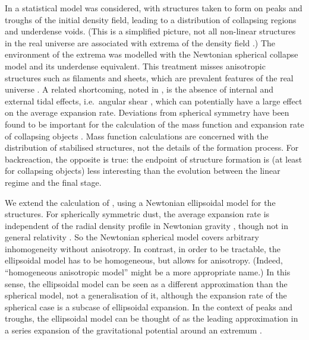 \documentclass[11pt, a4paper]{article}
\newcommand{\ie}{i.e.\ }
\begin{document}
In \cite{Rasanen:2008it} a statistical model was considered, with structures taken to form on peaks and troughs of the initial density field, leading to a distribution of collapsing regions and underdense voids. (This is a simplified picture, not all non-linear structures in the real universe are associated with extrema of the density field \cite{Shandarin:1984, Katz:1993, vandeWeygaert:1994ww, Kofman:1994pz, Porciani:2001er, Ludlow:2010xd}.)
The environment of the extrema was modelled with the Newtonian spherical collapse model and its underdense equivalent. This treatment misses anisotropic structures such as filaments and sheets, which are prevalent features of the real universe \cite{Bond:1995yt, Cautun:2014fwa}.
A related shortcoming, noted in \cite{Rasanen:2008it}, is the absence of internal and external tidal effects, \ie angular shear \cite{Zeldovich:1970, Icke:1973, White:1979, Peebles:1980, Shandarin:1984, Hoffman:1986, Eisenstein:1994ni, vandeWeygaert:1995pz, Audit:1996zj, Bond:1996, DelPopolo:2001fq, Popolo:2002}, which can potentially have a large effect on the average expansion rate. Deviations from spherical symmetry have been found to be important for the calculation of the mass function and expansion rate of collapsing objects \cite{Sheth:1999su, Sheth:2001dp, Ohta:2003zc, Ohta:2004mx, Lam:2008ik, Robertson:2008jr, Angrick:2010qg, Ludlow:2011jx, Paranjape:2012ks, Paranjape:2012jt, Reischke:2016dop}. Mass function calculations are concerned with the distribution of stabilised structures, not the details of the formation process. For backreaction, the opposite is true: the endpoint of structure formation is (at least for collapsing objects) less interesting than the evolution between the linear regime and the final stage.

We extend the calculation of \cite{Rasanen:2008it}, using a Newtonian ellipsoidal model for the structures. For spherically symmetric dust, the average expansion rate is independent of the radial density profile in Newtonian gravity \cite{Buchert:1999pq}, though not in general relativity \cite{Chuang:2005yi, *Paranjape:2006cd, Kai:2006ws, Lavinto:2013exa}. So the Newtonian spherical model covers arbitrary inhomogeneity without anisotropy. In contrast, in order to be tractable, the ellipsoidal model has to be homogeneous, but allows for anisotropy. (Indeed, ``homogeneous anisotropic model'' might be a more appropriate name.)
In this sense, the ellipsoidal model can be seen as a different approximation than the spherical model, not a generalisation of it, although the expansion rate of the spherical case is a subcase of ellipsoidal expansion.
In the context of peaks and troughs, the ellipsoidal model can be thought of as the leading approximation in a series expansion of the gravitational potential around an extremum \cite{Bond:1996}.
\end{document}
